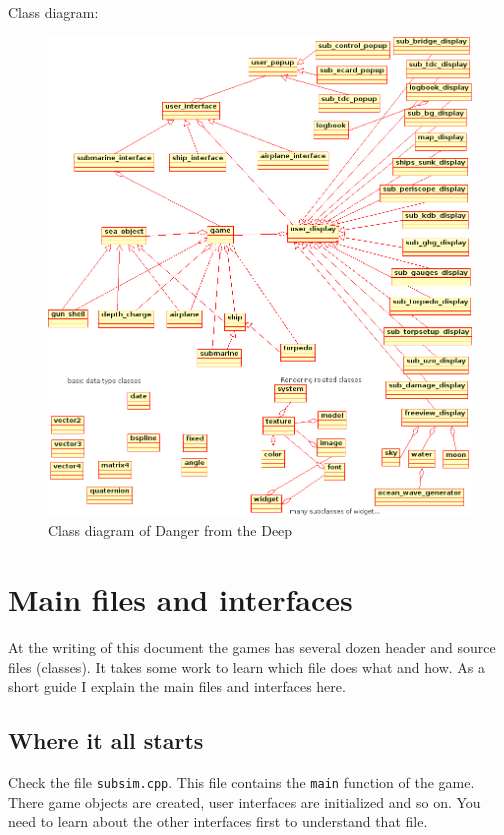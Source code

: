\documentclass[english,a4paper,12pt]{report}
\newcommand{\dftd}{\textsf{Danger from the Deep}}
\begin{document}
Class diagram:

\begin{figure}[ht]
\centering
\includegraphics[width=18cm]{classdiagram}
\caption{Class diagram of \dftd}
\label{classdiagram}
\end{figure}

\section{Main files and interfaces}

At the writing of this document the games has several dozen header and
source files (classes). It takes some work to learn which file does what
and how. As a short guide I explain the main files and interfaces here.

\subsection{Where it all starts}

Check the file \texttt{subsim.cpp}. This file contains the \texttt{main}
function of the game. There game objects are created, user interfaces
are initialized and so on. You need to learn about the other interfaces
first to understand that file.
\end{document}
